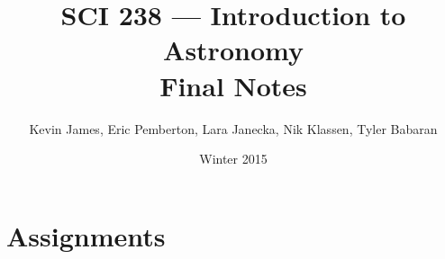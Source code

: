\documentclass[12pt]{article}
\begin{document}
\title{SCI 238 --- Introduction to Astronomy \\ Final Notes}
\author{Kevin James, Eric Pemberton, Lara Janecka, Nik Klassen, Tyler Babaran}
\date{\vspace{-2ex}Winter 2015}
\maketitle\HRule

\tableofcontents
\newpage





\section{Assignments}

\end{document}
